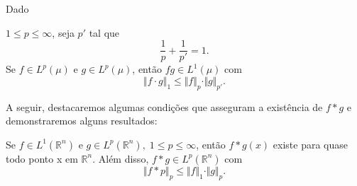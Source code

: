 \documentclass[../distribution_theory_notes.tex]{subfiles}
\begin{document}
\begin{tcolorbox}[
		skin=enhanced,
		title=Lembrete!,
		after title={\hfill Desigualdade de Hölder},
		fonttitle=\bfseries,
		sharp corners=downhill,
		colframe=black,
		colbacktitle=yellow!75!white,
		colback=yellow!30,
		colbacklower=black,
		coltitle=black,
		drop large lifted shadow
	]

	\begin{theorem*}
		\hypertarget{holder_inequality}{Dado} \(1\leq p\leq \infty\), seja \(p'\) tal que
		\[
			\frac{1}{p}+\frac{1}{p'}=1.
		\]
		Se \(f\in L^{p}(\mu )\) e \(g\in L^{p}(\mu )\), então \(fg\in L^{1}(\mu )\) com
		\[
			\Vert f \cdot g \Vert_{1}\leq \Vert f \Vert_p \cdot \Vert g \Vert_{p'}.
		\]
	\end{theorem*}

\end{tcolorbox}

A seguir, destacaremos algumas condições que asseguram a existência de \(f*g\) e demonstraremos alguns resultados:
\hypertarget{young_inequality}{
	\begin{theorem*}
		Se \(f\in L^{1}(\mathbb{R}^{n})\) e \(g\in L^{p}(\mathbb{R}^{n}),\; 1\leq p\leq \infty\), então \(f*g(x)\) existe para quase todo ponto x em \(\mathbb{R}^{n}\). Além disso, \(f*g\in L^{p}(\mathbb{R}^{n})\) com
		\[
			\Vert f*p \Vert_{p}\leq \Vert f \Vert_{1} \cdot \Vert g \Vert_{p}.
		\]
	\end{theorem*}
}
\end{document}
